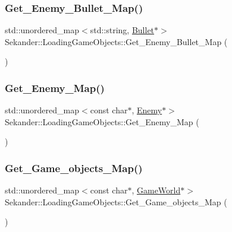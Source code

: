\subsubsection{\texorpdfstring{Get\+\_\+\+Enemy\+\_\+\+Bullet\+\_\+\+Map()}{Get\_Enemy\_Bullet\_Map()}}
{\footnotesize\ttfamily std\+::unordered\+\_\+map$<$std\+::string, \hyperlink{classSekander_1_1Bullet}{Bullet}$\ast$$>$ Sekander\+::\+Loading\+Game\+Objects\+::\+Get\+\_\+\+Enemy\+\_\+\+Bullet\+\_\+\+Map (\begin{DoxyParamCaption}{ }\end{DoxyParamCaption})\hspace{0.3cm}{\ttfamily [inline]}}

\mbox{\label{classSekander_1_1LoadingGameObjects_af1d51f5b67f7476c022f8161323734bd}} 
\subsubsection{\texorpdfstring{Get\+\_\+\+Enemy\+\_\+\+Map()}{Get\_Enemy\_Map()}}
{\footnotesize\ttfamily std\+::unordered\+\_\+map$<$const char$\ast$, \hyperlink{classSekander_1_1Enemy}{Enemy}$\ast$$>$ Sekander\+::\+Loading\+Game\+Objects\+::\+Get\+\_\+\+Enemy\+\_\+\+Map (\begin{DoxyParamCaption}{ }\end{DoxyParamCaption})\hspace{0.3cm}{\ttfamily [inline]}}

\mbox{\label{classSekander_1_1LoadingGameObjects_a0b894ea1b1abd089c3e7c5934344ae14}} 
\subsubsection{\texorpdfstring{Get\+\_\+\+Game\+\_\+objects\+\_\+\+Map()}{Get\_Game\_objects\_Map()}}
{\footnotesize\ttfamily std\+::unordered\+\_\+map$<$const char$\ast$, \hyperlink{classSekander_1_1GameWorld}{Game\+World}$\ast$$>$ Sekander\+::\+Loading\+Game\+Objects\+::\+Get\+\_\+\+Game\+\_\+objects\+\_\+\+Map (\begin{DoxyParamCaption}{ }\end{DoxyParamCaption})\hspace{0.3cm}{\ttfamily [inline]}}

